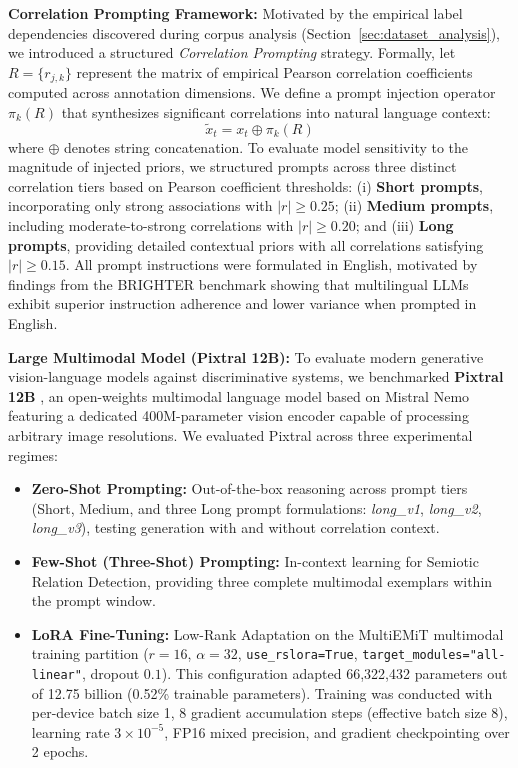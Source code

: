 \noindent\textbf{Correlation Prompting Framework:} Motivated by the empirical label dependencies discovered during corpus analysis (Section~\ref{sec:dataset_analysis}), we introduced a structured \textit{Correlation Prompting} strategy. Formally, let $R = \{r_{j,k}\}$ represent the matrix of empirical Pearson correlation coefficients computed across annotation dimensions. We define a prompt injection operator $\pi_k(R)$ that synthesizes significant correlations into natural language context:
\begin{equation}
\label{eq:prompt_injection}
\tilde{x}_t = x_t \oplus \pi_k(R)
\end{equation}
where $\oplus$ denotes string concatenation. To evaluate model sensitivity to the magnitude of injected priors, we structured prompts across three distinct correlation tiers based on Pearson coefficient thresholds: (i) \textbf{Short prompts}, incorporating only strong associations with $|r| \ge 0.25$; (ii) \textbf{Medium prompts}, including moderate-to-strong correlations with $|r| \ge 0.20$; and (iii) \textbf{Long prompts}, providing detailed contextual priors with all correlations satisfying $|r| \ge 0.15$. All prompt instructions were formulated in English, motivated by findings from the BRIGHTER benchmark \cite{brighter_project} showing that multilingual LLMs exhibit superior instruction adherence and lower variance when prompted in English.

\noindent\textbf{Large Multimodal Model (Pixtral 12B):} To evaluate modern generative vision-language models against discriminative systems, we benchmarked \textbf{Pixtral 12B} \cite{pixtral}, an open-weights multimodal language model based on Mistral Nemo featuring a dedicated 400M-parameter vision encoder capable of processing arbitrary image resolutions.
We evaluated Pixtral across three experimental regimes:
\begin{itemize}
    \item \textbf{Zero-Shot Prompting:} Out-of-the-box reasoning across prompt tiers (Short, Medium, and three Long prompt formulations: \textit{long\_v1}, \textit{long\_v2}, \textit{long\_v3}), testing generation with and without correlation context.
    \item \textbf{Few-Shot (Three-Shot) Prompting:} In-context learning for Semiotic Relation Detection, providing three complete multimodal exemplars within the prompt window.
    \item \textbf{LoRA Fine-Tuning:} Low-Rank Adaptation on the MultiEMiT multimodal training partition ($r=16$, $\alpha=32$, \texttt{use\_rslora=True}, \texttt{target\_modules="all-linear"}, dropout $0.1$). This configuration adapted 66,322,432 parameters out of 12.75 billion (0.52\% trainable parameters). Training was conducted with per-device batch size 1, 8 gradient accumulation steps (effective batch size 8), learning rate $3 \times 10^{-5}$, FP16 mixed precision, and gradient checkpointing over 2 epochs.
\end{itemize}

